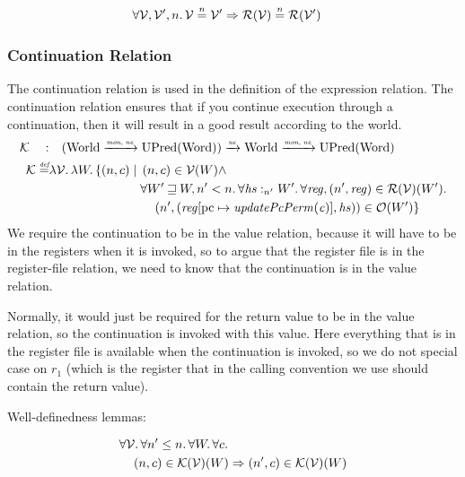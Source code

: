 \documentclass[a4paper]{article}
\newcommand{\update}[2]{[#1 \mapsto #2]}
\newcommand{\monnefun}{\xrightarrow{\textit{\tiny{mon, ne}}}}
\newcommand{\nefun}{\xrightarrow{\textit{\tiny{ne}}}}
\newcommand{\defeq}{\stackrel{\textit{\tiny{def}}}{=}}
\newcommand{\nequal}[1][n]{\stackrel{\tiny{#1}}{=}}
\newcommand{\var}[1]{\mathit{#1}}
\newcommand{\hs}{\var{hs}}
\newcommand{\pcreg}{\mathrm{pc}}
\newcommand{\reg}{\var{reg}}
\newcommand{\heap}{\var{heap}}
\newcommand{\plainfun}[2]{
  \ifthenelse{\equal{#2}{}}
             {\mathit{#1}}
             {\mathit{#1}(#2)}
}
\newcommand{\updatePcPerm}[1]{\plainfun{updatePcPerm}{#1}}
\newcommand{\future}{\mathbin{\sqsupseteq}}
\newcommand{\heapSat}[3][\heap]{#1 :_{#2} #3}
\newcommand{\asmType}{\plaindom{AsmType}}
\newcommand{\plaindom}[1]{\mathrm{#1}}
\newcommand{\Words}{\plaindom{Word}}
\newcommand{\Worlds}{\plaindom{World}}
\newcommand{\UPred}[1]{\plaindom{UPred}(#1)}
\newcommand{\intr}[2]{\mathcal{#1}}
\newcommand{\valueintr}[1]{\intr{V}{#1}}
\newcommand{\contintr}[1]{\intr{K}{#1}}
\newcommand{\regintr}[1]{\intr{R}{#1}}
\newcommand{\stdvr}{\valueintr{\asmType}}
\newcommand{\stdrr}{\regintr{\asmType}}
\newcommand{\stdkr}{\contintr{\asmType}}
\newcommand{\observations}{\mathcal{O}}
\newcommand{\npair}[2][n]{\left(#1,#2 \right)}
\begin{document}
\begin{lemma}
\label{lem:reg-ne-vr}
\begin{align*}
  &\forall \stdvr, \stdvr', n \ldotp \stdvr \nequal \stdvr' \Rightarrow \stdrr(\stdvr) \nequal \stdrr(\stdvr')
\end{align*}
\end{lemma}

\subsubsection{Continuation Relation}
\label{subsubsec:continuation-relation}
The continuation relation is used in the definition of the expression relation. The continuation relation ensures that if you continue execution through a continuation, then it will result in a good result according to the world.
\begin{align*}
  \stdkr \quad : & \quad (\Worlds \monnefun \UPred{\Words}) \nefun \Worlds \monnefun \UPred{\Words} \\
  \stdkr \defeq & \lambda \stdvr \ldotp \lambda W \ldotp\{ \npair{c} \mid
                     \begin{aligned}[t]
                       & \npair{c} \in \stdvr(W) \land \\
                       &  \forall W' \future W, n' < n\ldotp %
                       \forall \heapSat[\hs]{n'}{W'} \ldotp \forall \reg, \npair[n']{\reg} \in \stdrr(\stdvr)(W') \ldotp \\
                       & \quad \npair[n']{(\reg\update{\pcreg}{\updatePcPerm{\var{c}}},\hs)} \in \observations(W') \}
                 \end{aligned}
\end{align*}
We require the continuation to be in the value relation, because it will have to be in the registers when it is invoked, so to argue that the register file is in the register-file relation, we need to know that the continuation is in the value relation.

Normally, it would just be required for the return value to be in the value relation, so the continuation is invoked with this value. Here everything that is in the register file is available when the continuation is invoked, so we do not special case on $r_1$ (which is the register that in the calling convention we use should contain the return value). 


Well-definedness lemmas:
\begin{lemma}
\label{lem:stdkr-dc}
  \begin{align*}
    &\forall \stdvr \ldotp \forall n' \leq n \ldotp \forall W \ldotp \forall c \ldotp\\
    &\quad \npair{c} \in \stdkr(\stdvr)(W) \Rightarrow \npair[n']{c} \in \stdkr(\stdvr)(W)
  \end{align*}
\end{lemma}
\end{document}
